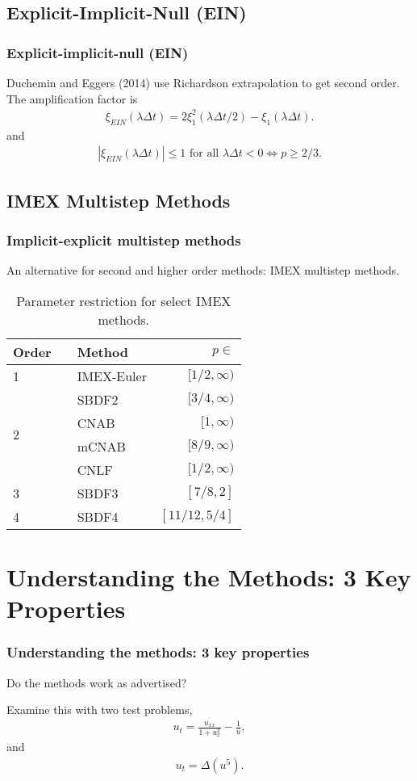 \documentclass[hyperref={pdfpagelabels=false}]{beamer}
\begin{document}
\subsection{Explicit-Implicit-Null (EIN)} 
\begin{frame}
	\frametitle{Explicit-implicit-null (EIN)} 
Duchemin and Eggers (2014) use Richardson extrapolation to get second order. The amplification factor is  
	\begin{align*}
		\xi_{EIN}(\lambda\Delta t) 
		= 2\xi^2_1(\lambda\Delta t/2) - \xi_1(\lambda\Delta t).
	\end{align*}
and 
	\begin{align*}
		\left\vert \xi_{EIN}(\lambda\Delta t) \right\vert \leq 1 \text{ for all } \lambda\Delta t < 0 \iff p \geq 2/3.
	\end{align*}
\end{frame}

\subsection{IMEX Multistep Methods}
\begin{frame}
	\frametitle{Implicit-explicit multistep methods}
An alternative for second and higher order methods: IMEX multistep methods.
\vspace{-10pt}
\begin{table}[htb!]
	\centering  
	\caption{Parameter restriction for select IMEX methods.}
	\begin{tabular}{lllr}
		\toprule
		Order && Method & $p\in$
		\\ \midrule 
		1 && IMEX-Euler & $[1/2,\infty)$ 
		\\ \cmidrule{1-3}
		\multirow{4}{*}{2} && SBDF2 & $[3/4,\infty)$
		\\
		&& CNAB & $[1,\infty)$ 
		\\
		&& mCNAB & $[8/9,\infty)$ 
		\\
		&& CNLF & $[1/2,\infty)$
		\\ \cmidrule{1-3}
		3 && SBDF3 & $[7/8,2]$ 
		\\ \cmidrule{1-3}
		4 && SBDF4 & $[11/12,5/4]$
		\\
		\bottomrule
	\end{tabular}
\end{table}
\end{frame}

\section{Understanding the Methods: 3 Key Properties} 
\begin{frame}
	\frametitle{Understanding the methods: 3 key properties}
Do the methods work as advertised? 	

Examine this with two test problems,
	\begin{align*}
		u_t = \frac{u_{xx}}{1 + u_x^2} - \frac{1}{u}, 
	\end{align*}
and 
	\begin{align*}
		u_t = \Delta(u^5).
	\end{align*}
\end{frame}
\end{document}
